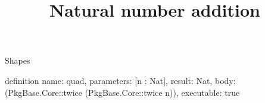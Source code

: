 \begin{lexlean}{Shapes}
\title{Natural number addition}
\begin{semanticmodule}
definition{
  name: quad,
  parameters: [n : Nat],
  result: Nat,
  body: (PkgBase.Core::twice (PkgBase.Core::twice n)),
  executable: true
}
\end{semanticmodule}
\end{lexlean}
